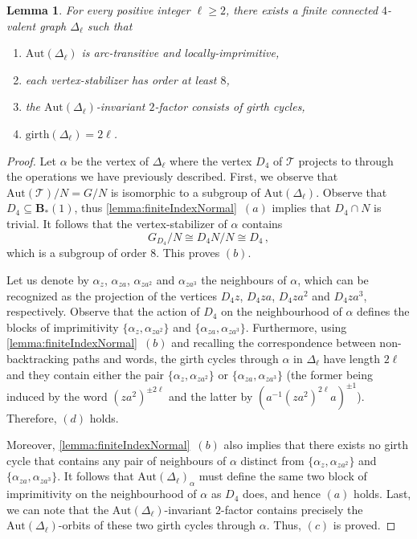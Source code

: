\documentclass[a4paper]{amsart}
\newcommand{\g}{\mathrm{girth}}
\newcommand{\Aut}{\mathrm{Aut}}
\newcommand{\B}{\mathbf{B}}
\newcommand{\0}{\mathbf{0}}
\newtheorem{lemma}[thm]{Lemma}
\theoremstyle{definition}
\begin{document}
\begin{lemma}\label{lemma:BassSerre}
    For every positive integer $\ell\ge 2$, there exists a finite connected $4$-valent graph $\Delta_\ell$ such that
    \begin{enumerate}[$(a)$]
        \item $\Aut(\Delta_\ell)$ is arc-transitive and locally-imprimitive,
        \item each vertex-stabilizer has order at least $8$,
        \item the $\mathrm{Aut}(\Delta_\ell)$-invariant $2$-factor consists of girth cycles,
        \item $\g(\Delta_\ell)=2 \ell$.
    \end{enumerate}
\end{lemma}
\begin{proof}
Let $\alpha$ be the vertex of $\Delta_\ell$ where the vertex $D_4$ of $\mathcal{T}$ projects to through the operations we have previously described. First, we observe that $\mathrm{Aut}(\mathcal{T})/N = G/N$ is isomorphic to a subgroup of $\mathrm{Aut}(\Delta_\ell)$. Observe that $D_4 \subseteq \B_\ast(1)$, thus \cref{lemma:finiteIndexNormal}~$(a)$ implies that $D_4 \cap N$ is trivial. It follows that the vertex-stabilizer of $\alpha$ contains
\[G_{D_4}/N \cong D_4N/N \cong D_4 \,,\]
which is a subgroup of order $8$. This proves $(b)$.
    
Let us denote by $\alpha_z$, $\alpha_{za}$, $\alpha_{za^2}$ and $\alpha_{za^3}$ the neighbours of $\alpha$, which can be recognized as the projection of the vertices $D_4 z$, $D_4 za$, $D_4 za^2$ and $D_4 za^3$, respectively. Observe that the action of $D_4$ on the neighbourhood of $\alpha$ defines the blocks of imprimitivity $\{\alpha_z, \alpha_{za^2}\}$ and $\{\alpha_{za}, \alpha_{za^3}\}$. Furthermore, using \cref{lemma:finiteIndexNormal}~$(b)$ and recalling the correspondence between non-backtracking paths and words, the girth cycles through $\alpha$ in $\Delta_\ell$ have length $2\ell$ and they contain either the pair $\{\alpha_z, \alpha_{za^2}\}$ or $\{\alpha_{za}, \alpha_{za^3}\}$ (the former being induced by the word $(za^2)^{\pm 2\ell}$ and the latter by $(a^{-1}(za^2)^{2\ell} a)^{\pm 1}$). Therefore, $(d)$ holds.

Moreover, \cref{lemma:finiteIndexNormal}~$(b)$ also implies that there exists no girth cycle that contains any pair of neighbours of $\alpha$ distinct from $\{\alpha_z, \alpha_{za^2}\}$ and $\{\alpha_{za}, \alpha_{za^3}\}$. It follows that $\mathrm{Aut}(\Delta_\ell)_\alpha$ must define the same two block of imprimitivity on the neighbourhood of $\alpha$ as $D_4$ does, and hence $(a)$ holds. Last, we can note that the $\mathrm{Aut}(\Delta_\ell)$-invariant $2$-factor contains precisely the $\mathrm{Aut}(\Delta_\ell)$-orbits of these two girth cycles through $\alpha$. Thus, $(c)$ is proved.
\end{proof}
\end{document}

